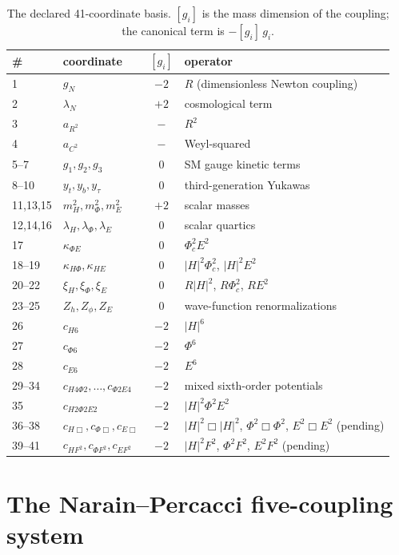 \documentclass[11pt]{article}
\begin{document}
\begin{table}[htbp]
  \centering
  \caption{The declared 41-coordinate basis.  $[g_i]$ is the mass dimension
  of the coupling; the canonical term is $-[g_i]\,g_i$.}
  \label{tab:operators}
  \small
  \begin{tabular}{llc l}
    \toprule
    \# & coordinate & $[g_i]$ & operator \\
    \midrule
    1  & $g_N$       & $-2$ & $R$ (dimensionless Newton coupling) \\
    2  & $\lambda_N$ & $+2$ & cosmological term \\
    3  & $a_{R^2}$   & $-$ & $R^2$ \\
    4  & $a_{C^2}$   & $-$ & Weyl-squared \\
    5--7  & $g_1,g_2,g_3$ & $0$ & SM gauge kinetic terms \\
    8--10 & $y_t,y_b,y_\tau$ & $0$ & third-generation Yukawas \\
    11,13,15 & $m_H^2,m_\Phi^2,m_E^2$ & $+2$ & scalar masses \\
    12,14,16 & $\lambda_H,\lambda_\Phi,\lambda_E$ & $0$ & scalar quartics \\
    17 & $\kappa_{\Phi E}$ & $0$ & $\Phi_c^2 E^2$ \\
    18--19 & $\kappa_{H\Phi},\kappa_{HE}$ & $0$ & $|H|^2\Phi_c^2$, $|H|^2E^2$ \\
    20--22 & $\xi_H,\xi_\Phi,\xi_E$ & $0$ & $R|H|^2$, $R\Phi_c^2$, $RE^2$ \\
    23--25 & $Z_h,Z_\phi,Z_E$ & $0$ & wave-function renormalizations \\
    26 & $c_{H6}$ & $-2$ & $|H|^6$ \\
    27 & $c_{\Phi6}$ & $-2$ & $\Phi^6$ \\
    28 & $c_{E6}$ & $-2$ & $E^6$ \\
    29--34 & $c_{H4\Phi2},\ldots,c_{\Phi2E4}$ & $-2$ & mixed sixth-order potentials \\
    35 & $c_{H2\Phi2E2}$ & $-2$ & $|H|^2\Phi^2E^2$ \\
    36--38 & $c_{H\Box},c_{\Phi\Box},c_{E\Box}$ & $-2$ & $|H|^2\Box|H|^2$, $\Phi^2\Box\Phi^2$, $E^2\Box E^2$ (pending) \\
    39--41 & $c_{HF^2},c_{\Phi F^2},c_{EF^2}$ & $-2$ & $|H|^2F^2$, $\Phi^2F^2$, $E^2F^2$ (pending) \\
    \bottomrule
  \end{tabular}
\end{table}

\section{The Narain--Percacci five-coupling system}
\label{app:np}
\end{document}
